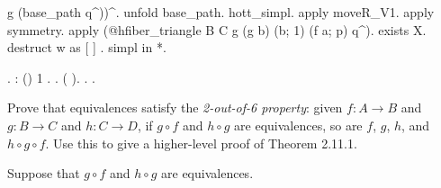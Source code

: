 \begin{coqdoccode}
\begin{coqdoccomment}
g\coqdocindent{0.50em}
(base\_path\coqdocindent{0.50em}
q\^{}))\^{}.\coqdocindent{0.50em}
unfold\coqdocindent{0.50em}
base\_path.\coqdocindent{0.50em}
hott\_simpl.\coqdoceol
\coqdocindent{1.00em}
apply\coqdocindent{0.50em}
moveR\_V1.\coqdoceol
\coqdocindent{1.00em}
apply\coqdocindent{0.50em}
symmetry.\coqdoceol
\coqdocindent{1.00em}
apply\coqdocindent{0.50em}
(@hfiber\_triangle\coqdocindent{0.50em}
B\coqdocindent{0.50em}
C\coqdocindent{0.50em}
g\coqdocindent{0.50em}
(g\coqdocindent{0.50em}
b)\coqdocindent{0.50em}
(b;\coqdocindent{0.50em}
1)\coqdocindent{0.50em}
(f\coqdocindent{0.50em}
a;\coqdocindent{0.50em}
p)\coqdocindent{0.50em}
q\^{}).\coqdoceol
\coqdocindent{1.00em}
exists\coqdocindent{0.50em}
X.\coqdoceol
\coqdocindent{1.00em}
destruct\coqdocindent{0.50em}
w\coqdocindent{0.50em}
as\coqdocindent{0.50em}
[ ] .\coqdocindent{0.50em}
simpl\coqdocindent{0.50em}
in\coqdocindent{0.50em}
*.\coqdoceol
\coqdocindent{1.00em}
\end{coqdoccomment}
\coqdoceol
\coqdocnoindent
{}.\coqdoceol
\coqdocemptyline
\coqdocnoindent
{}  : \coqdocnotation{(} () \coqdocnotation{(}\coqdocnotation{;} 1\coqdocnotation{)}\coqdocnotation{)} \coqdocnotation{\ensuremath{\eqvsym}} \coqdocnotation{(}  \coqdocnotation{)}.\coqdoceol
\coqdocnoindent
{}.\coqdoceol
\coqdocindent{1.00em}
 (    ).\coqdoceol
\coqdocnoindent
{}.\coqdoceol
\coqdocemptyline
\coqdocnoindent
{} .\coqdoceol
\coqdocemptyline
\end{coqdoccode}
Prove that equivalences satisfy the \textit{2-out-of-6 property}: given $f : A \to B$
and $g : B \to C$ and $h : C \to D$, if $g \circ f$ and $h \circ g$ are
equivalences, so are $f$, $g$, $h$, and $h \circ g \circ f$.  Use this to give
a higher-level proof of Theorem 2.11.1.


 \soln
Suppose that $g \circ f$ and $h \circ g$ are equivalences.



